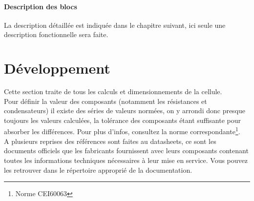 \documentclass[a4paper,10pt]{article}
\begin{document}
  \paragraph{Description des blocs}
  La description détaillée est indiquée dans le chapitre suivant, ici seule une description fonctionnelle sera faite.
  
  \pagebreak 
  \section{Développement}
  Cette section traite de tous les calculs et dimensionnements de la cellule.\\
  Pour définir la valeur des composants (notamment les résistances et condensateurs) il existe des séries de valeurs normées, on y arrondi donc presque toujours les valeurs calculées, la tolérance des composants étant suffisante pour absorber les différences. Pour plus d'infos, consultez la norme correspondante\footnote{Norme CEI60063}.\\
  A plusieurs reprises des références sont faites au datasheets, ce sont les documents officiels que les fabricants fournissent avec leurs composants contenant toutes les informations techniques nécessaires à leur mise en service. Vous pouvez les retrouver dans le répertoire approprié de la documentation.
\end{document}
